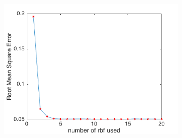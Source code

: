 \documentclass{article}
\begin{document}
\begin{enumerate}[label=(\alph*)]
\begin{figure}[t]
\begin{subfigure}{0.5\textwidth}
				 			\caption{}
				 			\label{fig:p-1-3-a_b}
				 		\end{subfigure}\\
				 		\begin{subfigure}{0.5\textwidth}
				 			\includegraphics[width=\linewidth]{images/p1-3-a_1_20.png}
				 			\caption{}
				 			\label{fig:p-1-3-a_c}
				 		\end{subfigure}


\end{figure}
\end{enumerate}
\end{document}

